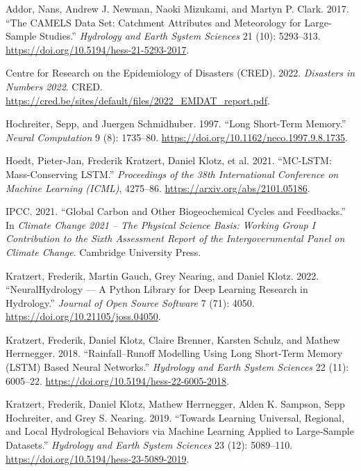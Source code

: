 \documentclass[
  letterpaper,
  DIV=11,
  numbers=noendperiod]{scrartcl}
\newlength{\cslhangindent}
\newenvironment{CSLReferences}[2] %
 {\begin{list}{}{%
  \setlength{\itemindent}{0pt}
  \setlength{\leftmargin}{0pt}
  \setlength{\parsep}{0pt}
  \ifodd #1
   \setlength{\leftmargin}{\cslhangindent}
   \setlength{\itemindent}{-1\cslhangindent}
  \fi
  \setlength{\itemsep}{#2\baselineskip}}}
 {\end{list}}
\begin{document}
\protect{}\label{refs}
\begin{CSLReferences}{1}{1}
Addor, Nans, Andrew J. Newman, Naoki Mizukami, and Martyn P. Clark.
2017. {``The {CAMELS} Data Set: Catchment Attributes and Meteorology for
Large-Sample Studies.''} \emph{Hydrology and Earth System Sciences} 21
(10): 5293--313. \url{https://doi.org/10.5194/hess-21-5293-2017}.

Centre for Research on the Epidemiology of Disasters (CRED). 2022.
\emph{Disasters in Numbers 2022}. CRED.
\url{https://cred.be/sites/default/files/2022_EMDAT_report.pdf}.

Hochreiter, Sepp, and Juergen Schmidhuber. 1997. {``Long Short-Term
Memory.''} \emph{Neural Computation} 9 (8): 1735--80.
\url{https://doi.org/10.1162/neco.1997.9.8.1735}.

Hoedt, Pieter-Jan, Frederik Kratzert, Daniel Klotz, et al. 2021.
{``{MC-LSTM}: Mass-Conserving {LSTM}.''} \emph{Proceedings of the 38th
International Conference on Machine Learning (ICML)}, 4275--86.
\url{https://arxiv.org/abs/2101.05186}.

IPCC. 2021. {``Global {Carbon} and {Other} {Biogeochemical} {Cycles} and
{Feedbacks}.''} In \emph{Climate {Change} 2021 -- {The} {Physical}
{Science} {Basis}: {Working} {Group} {I} {Contribution} to the {Sixth}
{Assessment} {Report} of the {Intergovernmental} {Panel} on {Climate}
{Change}}. Cambridge University Press.

Kratzert, Frederik, Martin Gauch, Grey Nearing, and Daniel Klotz. 2022.
{``{NeuralHydrology} --- {A} {Python} Library for Deep Learning Research
in Hydrology.''} \emph{Journal of Open Source Software} 7 (71): 4050.
\url{https://doi.org/10.21105/joss.04050}.

Kratzert, Frederik, Daniel Klotz, Claire Brenner, Karsten Schulz, and
Mathew Herrnegger. 2018. {``Rainfall--Runoff Modelling Using Long
Short-Term Memory ({LSTM}) Based Neural Networks.''} \emph{Hydrology and
Earth System Sciences} 22 (11): 6005--22.
\url{https://doi.org/10.5194/hess-22-6005-2018}.

Kratzert, Frederik, Daniel Klotz, Mathew Herrnegger, Alden K. Sampson,
Sepp Hochreiter, and Grey S. Nearing. 2019. {``Towards Learning
Universal, Regional, and Local Hydrological Behaviors via Machine
Learning Applied to Large-Sample Datasets.''} \emph{Hydrology and Earth
System Sciences} 23 (12): 5089--110.
\url{https://doi.org/10.5194/hess-23-5089-2019}.


\end{CSLReferences}
\end{document}
